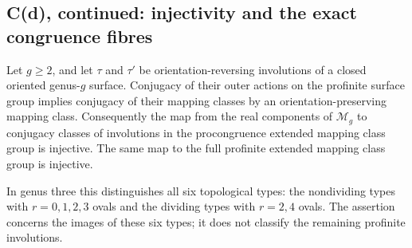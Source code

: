 \subsection{C(d), continued: injectivity and the exact congruence fibres}

\begin{theorem}
\label{C-real-type-injectivity}
Let $g\geq2$, and let $\tau$ and $\tau'$ be orientation-reversing
involutions of a closed oriented genus-$g$ surface. Conjugacy of their
outer actions on the profinite surface group implies conjugacy of their
mapping classes by an orientation-preserving mapping class.
Consequently the map from the real components of $\mathcal M_g$ to
conjugacy classes of involutions in the procongruence extended mapping
class group is injective. The same map to the full profinite extended
mapping class group is injective.

In genus three this distinguishes all six topological types: the
nondividing types with $r=0,1,2,3$ ovals and the dividing types with
$r=2,4$ ovals. The assertion concerns the images of these six types;
it does not classify the remaining profinite involutions.
\end{theorem}
